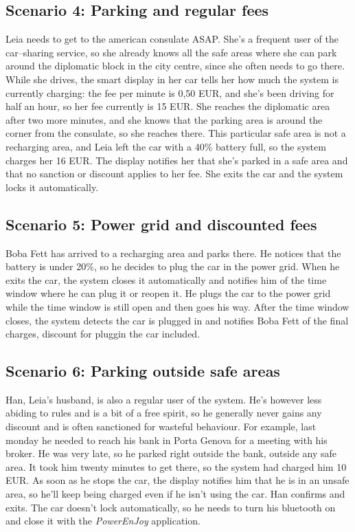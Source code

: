 \subsection{Scenario 4: Parking and regular fees}
	Leia needs to get to the american consulate ASAP. She's a frequent user of the car–sharing service, so she already knows all the safe areas where she can park around the diplomatic block in the city centre, since she often needs to go there. While she drives, the smart display in her car tells her how much the system is currently charging: the fee per minute is 0,50 EUR, and she's been driving for half an hour, so her fee currently is 15 EUR. She reaches the diplomatic area after two more minutes, and she knows that the parking area is around the corner from the consulate, so she reaches there. This particular safe area is not a recharging area, and Leia left the car with a 40\% battery full, so the system charges her 16 EUR. The display notifies her that she's parked in a safe area and that no sanction or discount applies to her fee. She exits the car and the system locks it automatically. 
	
\subsection{Scenario 5: Power grid and discounted fees}
	Boba Fett has arrived to a recharging area and parks there. He notices that the battery is under 20\%, so he decides to plug the car in the power grid. When he exits the car, the system closes it automatically and notifies him of the time window where he can plug it or reopen it. He plugs the car to the power grid while the time window is still open and then goes his way. After the time window closes, the system detects the car is plugged in and notifies Boba Fett of the final charges, discount for pluggin the car included. 
	
\subsection{Scenario 6: Parking outside safe areas}
	Han, Leia's husband, is also a regular user of the system. He's however less abiding to rules and is a bit of a free spirit, so he generally never gains any discount and is often sanctioned for wasteful behaviour. For example, last monday he needed to reach his bank in Porta Genova for a meeting with his broker. He was very late, so he parked right outside the bank, outside any safe area. It took him twenty minutes to get there, so the system had charged him 10 EUR. As soon as he stops the car, the display notifies him that he is in an unsafe area, so he'll keep being charged even if he isn't using the car. Han confirms and exits. The car doesn't lock automatically, so he needs to turn his bluetooth on and close it with the \textit{PowerEnJoy} application. 

